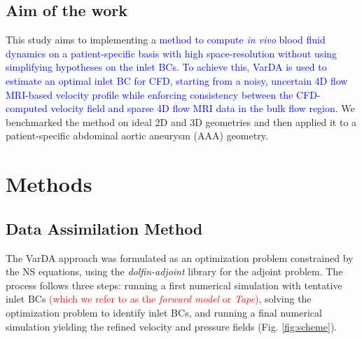 \subsection*{Aim of the work}
This study aims to implementing a \textcolor{blue}{method to compute \textit{in vivo} blood fluid dynamics on a patient-specific basis with high space-resolution without using simplifying hypotheses on the inlet BCs. To achieve this, VarDA is used to estimate an optimal inlet BC for CFD, starting from a noisy, uncertain 4D flow MRI-based velocity profile while enforcing consistency between the CFD-computed velocity field and sparse 4D flow MRI data in the bulk flow region.} We benchmarked the method on ideal 2D and 3D geometries and then applied it to a patient-specific abdominal aortic aneurysm (AAA) geometry. 

\section*{Methods}
\label{sec:methods}

\subsection*{Data Assimilation Method}
The VarDA approach was formulated as an optimization problem constrained by the NS equations, using the \emph{dolfin-adjoint} library for the adjoint problem. The process follows three steps: running a first numerical simulation with tentative inlet BCs \textcolor{red}{(which we refer to as the \emph{forward model} or \emph{Tape})}, solving the optimization problem to identify inlet BCs, and running a final numerical simulation yielding the refined velocity and pressure fields (Fig. \ref{fig:scheme}).

